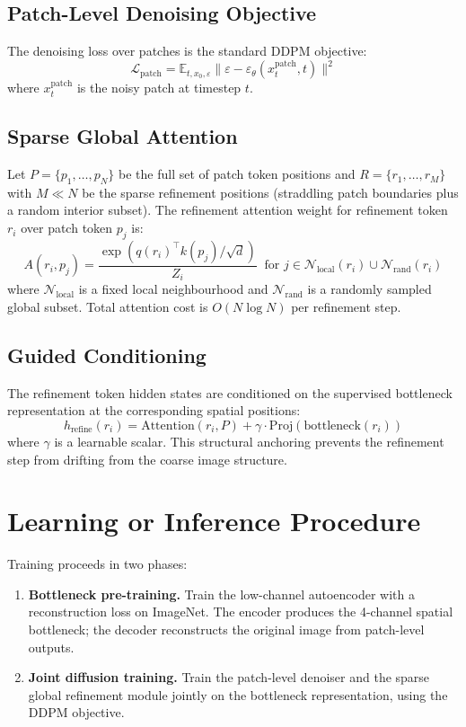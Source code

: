 \documentclass[10pt,twocolumn]{article}
\begin{document}
\subsection{Patch-Level Denoising Objective}

The denoising loss over patches is the standard DDPM objective:
\[
  \mathcal{L}_\mathrm{patch} = \mathbb{E}_{t, x_0, \varepsilon}
  \|\varepsilon - \varepsilon_\theta(x_t^\mathrm{patch}, t)\|^2
\]
where $x_t^\mathrm{patch}$ is the noisy patch at timestep $t$.

\subsection{Sparse Global Attention}

Let $P = \{p_1, \ldots, p_N\}$ be the full set of patch token positions
and $R = \{r_1, \ldots, r_M\}$ with $M \ll N$ be the sparse refinement
positions (straddling patch boundaries plus a random interior subset).
The refinement attention weight for refinement token $r_i$ over patch
token $p_j$ is:
\[
  A(r_i, p_j) =
  \frac{\exp\!\left(q(r_i)^\top k(p_j) / \sqrt{d}\right)}{Z_i}
  \;\;\text{for } j \in \mathcal{N}_\mathrm{local}(r_i) \cup \mathcal{N}_\mathrm{rand}(r_i)
\]
where $\mathcal{N}_\mathrm{local}$ is a fixed local neighbourhood and
$\mathcal{N}_\mathrm{rand}$ is a randomly sampled global subset. Total
attention cost is $O(N \log N)$ per refinement step.

\subsection{Guided Conditioning}

The refinement token hidden states are conditioned on the supervised
bottleneck representation at the corresponding spatial positions:
\[
  h_\mathrm{refine}(r_i)
  = \mathrm{Attention}(r_i, P)
  + \gamma \cdot \mathrm{Proj}\!\left(\mathrm{bottleneck}(r_i)\right)
\]
where $\gamma$ is a learnable scalar. This structural anchoring prevents
the refinement step from drifting from the coarse image structure.

\section{Learning or Inference Procedure}

Training proceeds in two phases:
\begin{enumerate}[itemsep=2pt,parsep=0pt]
  \item \textbf{Bottleneck pre-training.} Train the low-channel
    autoencoder with a reconstruction loss on ImageNet. The encoder
    produces the 4-channel spatial bottleneck; the decoder reconstructs
    the original image from patch-level outputs.
  \item \textbf{Joint diffusion training.} Train the patch-level
    denoiser and the sparse global refinement module jointly on the
    bottleneck representation, using the DDPM objective.
\end{enumerate}
\end{document}
